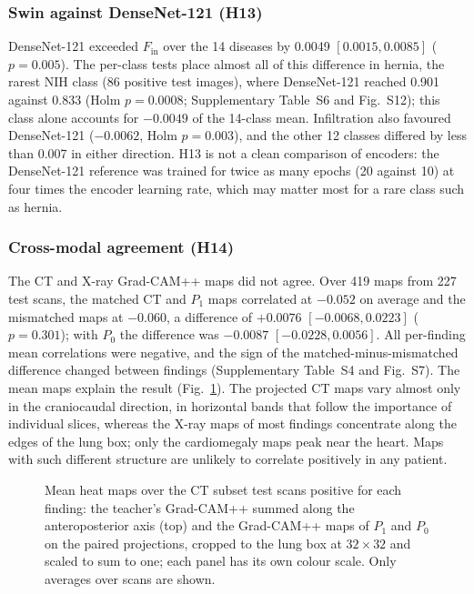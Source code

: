 \subsubsection{Swin against DenseNet-121 (H13)}
DenseNet-121 exceeded $F_{\mathrm{in}}$ over the 14 diseases by 0.0049 $[0.0015, 0.0085]$ ($p=0.005$). The per-class tests place almost all
of this difference in hernia, the rarest NIH class (86 positive test images), where DenseNet-121 reached 0.901 against 0.833 (Holm
$p=0.0008$; Supplementary Table~S6 and Fig.~S12); this class alone accounts for $-0.0049$ of the 14-class mean. Infiltration also favoured
DenseNet-121 ($-0.0062$, Holm $p=0.003$), and the other 12 classes differed by less than 0.007 in either direction. H13 is not a clean
comparison of encoders: the DenseNet-121 reference was trained for twice as many epochs (20 against 10) at four times the encoder learning
rate, which may matter most for a rare class such as hernia.

\subsubsection{Cross-modal agreement (H14)}
The CT and X-ray Grad-CAM++ maps did not agree. Over 419 maps from 227 test scans, the matched CT and $P_1$ maps correlated at $-0.052$ on
average and the mismatched maps at $-0.060$, a difference of $+0.0076$ $[-0.0068, 0.0223]$ ($p=0.301$); with $P_0$ the difference was
$-0.0087$ $[-0.0228, 0.0056]$. All per-finding mean correlations were negative, and the sign of the matched-minus-mismatched difference
changed between findings (Supplementary Table~S4 and Fig.~S7). The mean maps explain the result (Fig.~\ref{fig:xm_maps}). The projected CT
maps vary almost only in the craniocaudal direction, in horizontal bands that follow the importance of individual slices, whereas the X-ray
maps of most findings concentrate along the edges of the lung box; only the cardiomegaly maps peak near the heart. Maps with such different
structure are unlikely to correlate positively in any patient.

\begin{figure}[!t]
\centering
{}
\caption{Mean heat maps over the CT subset test scans positive for each finding: the teacher's Grad-CAM++ summed along the anteroposterior
axis (top) and the Grad-CAM++ maps of $P_1$ and $P_0$ on the paired projections, cropped to the lung box at $32\times32$ and scaled to sum
to one; each panel has its own colour scale. Only averages over scans are shown.}
\label{fig:xm_maps}
\end{figure}

